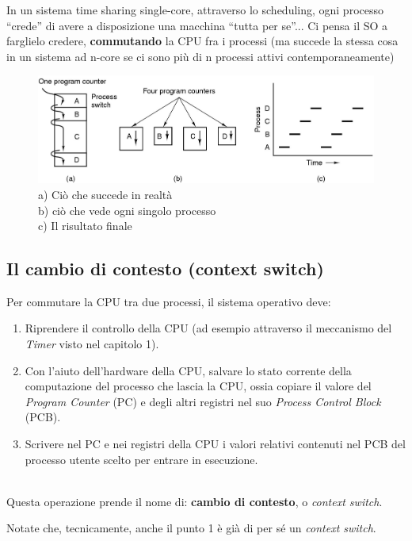
In un sistema time sharing single-core, attraverso lo scheduling, ogni processo “crede” di avere a disposizione una macchina “tutta per se”...
Ci pensa il SO a farglielo credere, \textbf{commutando} la CPU fra i processi (ma succede la stessa cosa in un sistema ad n-core se ci sono più di n processi attivi contemporaneamente)
\begin{figure}[h]
    \centering
    \includegraphics[width=0.5\linewidth]{images/SchedulingProcessi.png}
    \caption{a) Ciò che succede in realtà\\b) ciò che vede ogni singolo processo\\c) Il risultato finale}
\end{figure}

\subsection{Il cambio di contesto (context switch)}
Per commutare la CPU tra due processi, il sistema operativo deve:

\begin{enumerate}
    \item Riprendere il controllo della CPU (ad esempio attraverso il meccanismo del \textit{Timer} visto nel capitolo 1).
    \item Con l'aiuto dell'hardware della CPU, salvare lo stato corrente della computazione del processo che lascia la CPU, ossia copiare il valore del \textit{Program Counter} (PC) e degli altri registri nel suo \textit{Process Control Block} (PCB).
    \item Scrivere nel PC e nei registri della CPU i valori relativi contenuti nel PCB del processo utente scelto per entrare in esecuzione.
\end{enumerate}\\

Questa operazione prende il nome di: \textbf{cambio di contesto}, o \textit{context switch}.

Notate che, tecnicamente, anche il punto 1 è già di per sé un \textit{context switch}.

